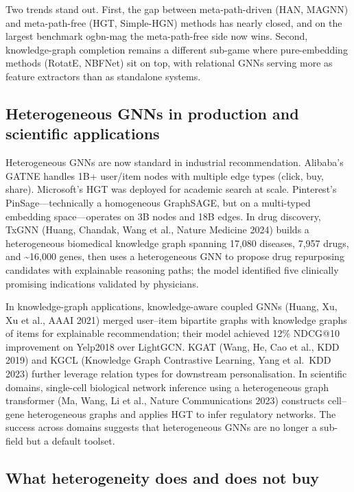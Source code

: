 Two trends stand out. First, the gap between meta-path-driven (HAN, MAGNN) and meta-path-free (HGT, Simple-HGN) methods has nearly closed, and on the largest benchmark ogbn-mag the meta-path-free side now wins. Second, knowledge-graph completion remains a different sub-game where pure-embedding methods (RotatE, NBFNet) sit on top, with relational GNNs serving more as feature extractors than as standalone systems.

\subsection{Heterogeneous GNNs in production and scientific applications}\label{heterogeneous-gnns-in-production-and-scientific-applications}

Heterogeneous GNNs are now standard in industrial recommendation. Alibaba's GATNE handles 1B+ user/item nodes with multiple edge types (click, buy, share). Microsoft's HGT was deployed for academic search at scale. Pinterest's PinSage---technically a homogeneous GraphSAGE, but on a multi-typed embedding space---operates on 3B nodes and 18B edges. In drug discovery, TxGNN (Huang, Chandak, Wang et al., Nature Medicine 2024) builds a heterogeneous biomedical knowledge graph spanning 17,080 diseases, 7,957 drugs, and \textasciitilde16,000 genes, then uses a heterogeneous GNN to propose drug repurposing candidates with explainable reasoning paths; the model identified five clinically promising indications validated by physicians.

In knowledge-graph applications, knowledge-aware coupled GNNs (Huang, Xu, Xu et al., AAAI 2021) merged user--item bipartite graphs with knowledge graphs of items for explainable recommendation; their model achieved 12\% NDCG@10 improvement on Yelp2018 over LightGCN. KGAT (Wang, He, Cao et al., KDD 2019) and KGCL (Knowledge Graph Contrastive Learning, Yang et al.~KDD 2023) further leverage relation types for downstream personalisation. In scientific domains, single-cell biological network inference using a heterogeneous graph transformer (Ma, Wang, Li et al., Nature Communications 2023) constructs cell--gene heterogeneous graphs and applies HGT to infer regulatory networks. The success across domains suggests that heterogeneous GNNs are no longer a sub-field but a default toolset.

\subsection{What heterogeneity does and does not buy}\label{what-heterogeneity-does-and-does-not-buy}

